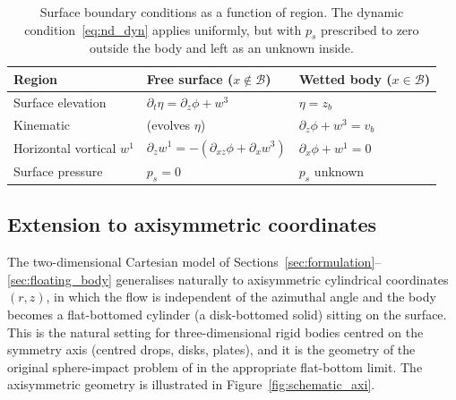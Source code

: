 \documentclass{article}
\begin{document}
\begin{table}[H]
    \centering
    \caption{Surface boundary conditions as a function of region.  The dynamic condition~\eqref{eq:nd_dyn} applies uniformly, but with $p_s$ prescribed to zero outside the body and left as an unknown inside.}
    \label{tab:body_bcs}
    \begin{tabular}{lll}
        \toprule
        Region & Free surface ($x \notin \mathcal{B}$) & Wetted body ($x \in \mathcal{B}$) \\
        \midrule
        Surface elevation & $\partial_t \eta = \partial_z\phi + w^3$ & $\eta = z_b$ \\
        Kinematic & (evolves $\eta$) & $\partial_z\phi + w^3 = v_b$ \\
        Horizontal vortical $w^1$ & $\partial_z w^1 = -(\partial_{xz}\phi + \partial_x w^3)$ & $\partial_x\phi + w^1 = 0$ \\
        Surface pressure & $p_s = 0$ & $p_s$ unknown \\
        \bottomrule
    \end{tabular}
\end{table}

\color{blue}
\subsection{Extension to axisymmetric coordinates}
\label{sec:axisymm}

The two-dimensional Cartesian model of Sections~\ref{sec:formulation}--\ref{sec:floating_body} generalises naturally to axisymmetric cylindrical coordinates $(r, z)$, in which the flow is independent of the azimuthal angle and the body becomes a flat-bottomed cylinder (a disk-bottomed solid) sitting on the surface.
This is the natural setting for three-dimensional rigid bodies centred on the symmetry axis (centred drops, disks, plates), and it is the geometry of the original sphere-impact problem of \citet{GaleanoRiosEtAl2017} in the appropriate flat-bottom limit.
The axisymmetric geometry is illustrated in Figure~\ref{fig:schematic_axi}.
\end{document}
